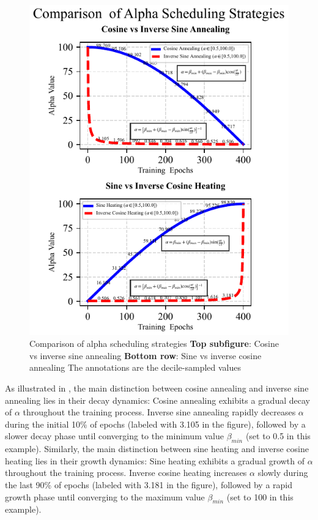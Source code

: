 \documentclass[10pt,twocolumn,letterpaper]{article}
\begin{document}
\begin{figure}[htbp]
	\center
	\vspace{-10pt} 
	\includegraphics[width=\columnwidth]{images/AlphaSch.pdf}
	\caption{Comparison of alpha scheduling strategies
	\textbf{Top subfigure}: Cosine vs inverse sine annealing
    \textbf{Bottom row}: Sine vs inverse cosine annealing
	The annotations are the decile-sampled values
	}
	\label{fig:AlphaSch}
\end{figure}

As illustrated in , the main distinction between cosine annealing and inverse sine annealing lies in their decay dynamics: Cosine annealing exhibits a gradual decay of $\alpha$ throughout the training process. Inverse sine annealing rapidly decreases $\alpha$ during the initial 10\% of epochs (labeled with 3.105 in the figure), followed by a slower decay phase until converging to the minimum value $\beta_{min}$ (set to 0.5 in this example). Similarly, the main distinction between sine heating and inverse cosine heating lies in their growth dynamics: Sine heating exhibits a gradual growth of $\alpha$ throughout the training process. Inverse cosine heating increases $\alpha$ slowly during the last 90\% of epochs (labeled with 3.181 in the figure), followed by a rapid growth phase until converging to the maximum value $\beta_{min}$ (set to 100 in this example).
\end{document}
